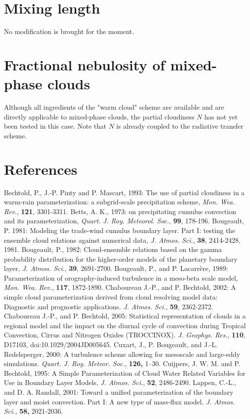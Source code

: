 \section{Mixing length}

No modification is brought for the moment.

\section{Fractional nebulosity of mixed-phase clouds}

Although all ingredients of the "warm cloud" scheme are available and are
directly applicable to mixed-phase clouds, the partial cloudiness $N$ has not 
yet been tested in this case. Note that $N$ is already coupled to the radiative 
transfer scheme.




\section{References}

\por 
Bechtold, P., J.-P. Pinty and P. Mascart, 1993:
The use of partial cloudiness in a warm-rain parameterization:
            a subgrid-scale precipitation scheme,
           {\it Mon. Wea. Rev.}, {\bf 121}, 3301-3311.
\por Betts, A. K., 1973:
on precipitating cumulus convection and its parameterization,
           {\it Quart. J. Roy. Meteorol. Soc.}, {\bf 99}, 178-196.
\por 
Bougeault, P. 1981:
Modeling the trade-wind cumulus boundary layer.  Part I:
                testing the ensemble cloud relations against numerical data,
           {\it J. Atmos. Sci.}, {\bf 38}, 2414-2428, 1981.
\por 
Bougeault, P., 1982:
Cloud-ensemble relations based on the gamma probability
distribution for the higher-order models of the planetary boundary layer,
{\it J. Atmos. Sci.}, {\bf 39}, 2691-2700.
\por
Bougeault, P., and P. Lacarr\`ere, 1989:
Parameterization of orography-induced turbulence in a meso-beta scale model,
{\it Mon. Wea. Rev.}, {\bf 117}, 1872-1890.
\por
Chaboureau J.-P., and P. Bechtold, 2002: 
A simple cloud parameterization derived from
cloud resolving model data: Diagnostic and prognostic applications.
{\it J. Atmos. Sci.}, {\bf 59}, 2362-2372.
\por
Chaboureau J.-P., and P. Bechtold, 2005: Statistical representation of clouds
in a regional model and the impact on the diurnal cycle of convection
during Tropical Convection, Cirrus and Nitrogen Oxides (TROCCINOX). 
{\it J. Geophys. Res.}, {\bf 110}, D17103, doi:10.1029/2004JD005645.
\por
Cuxart, J., P. Bougeault, and J.-L. Redelsperger, 2000:
A turbulence scheme allowing for mesoscale and large-eddy simulations.
{\it Quart. J. Roy. Meteor. Soc.}, {\bf 126,} 1--30.
\por 
Cuijpers, J. W. M. and P. Bechtold, 1995:
A Simple Parameterization of Cloud Water Related Variables 
for Use in Boundary Layer Models,
{\it J. Atmos. Sci.}, {\bf 52}, 2486-2490.
\por
Lappen, C.-L., and D. A. Randall, 2001: 
Toward a unified parameterization of the boundary layer and moist convection.
Part I: A new type of mass-flux model.
{\it J. Atmos. Sci.,} {\bf 58,} 2021-2036.

